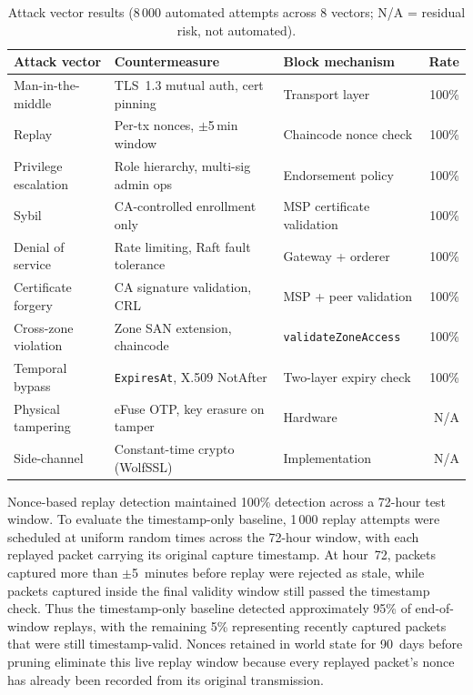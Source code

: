 \documentclass[a4paper,fleqn]{cas-dc}
\begin{document}
\begin{table}[width=\textwidth,pos=t]
\caption{Attack vector results (8\,000 automated attempts across
  8 vectors; N/A = residual risk, not automated).}
\label{tab:attacks}
\small
\begin{tabularx}{\tblwidth}{@{}
  >{\raggedright\arraybackslash}p{}
  >{\raggedright\arraybackslash}X
  >{\raggedright\arraybackslash}p{}
  r@{}}
\toprule
Attack vector & Countermeasure & Block mechanism & Rate \\
\midrule
Man-in-the-middle  & TLS~1.3 mutual auth, cert pinning & Transport layer & 100\% \\
Replay             & Per-tx nonces, $\pm$5\,min window & Chaincode nonce check & 100\% \\
Privilege escalation & Role hierarchy, multi-sig admin ops & Endorsement policy & 100\% \\
Sybil              & CA-controlled enrollment only & MSP certificate validation & 100\% \\
Denial of service  & Rate limiting, Raft fault tolerance & Gateway + orderer & 100\% \\
Certificate forgery & CA signature validation, CRL & MSP + peer validation & 100\% \\
Cross-zone violation & Zone SAN extension, chaincode & \texttt{validateZoneAccess} & 100\% \\
Temporal bypass    & \texttt{ExpiresAt}, X.509 NotAfter & Two-layer expiry check & 100\% \\
Physical tampering & eFuse OTP, key erasure on tamper & Hardware & N/A \\
Side-channel       & Constant-time crypto (WolfSSL) & Implementation & N/A \\
\bottomrule
\end{tabularx}
\end{table}

Nonce-based replay detection maintained 100\% detection across a
72-hour test window. To evaluate the timestamp-only baseline, 1\,000
replay attempts were scheduled at uniform random times across the
72-hour window, with each replayed packet carrying its original capture
timestamp. At hour~72, packets captured more than $\pm$5~minutes before
replay were rejected as stale, while packets captured inside the final
validity window still passed the timestamp check. Thus the timestamp-only
baseline detected approximately 95\% of end-of-window replays, with the
remaining 5\% representing recently captured packets that were still
timestamp-valid. Nonces retained in world state for 90~days before
pruning eliminate this live replay window because every replayed packet's
nonce has already been recorded from its original transmission.
\end{document}
